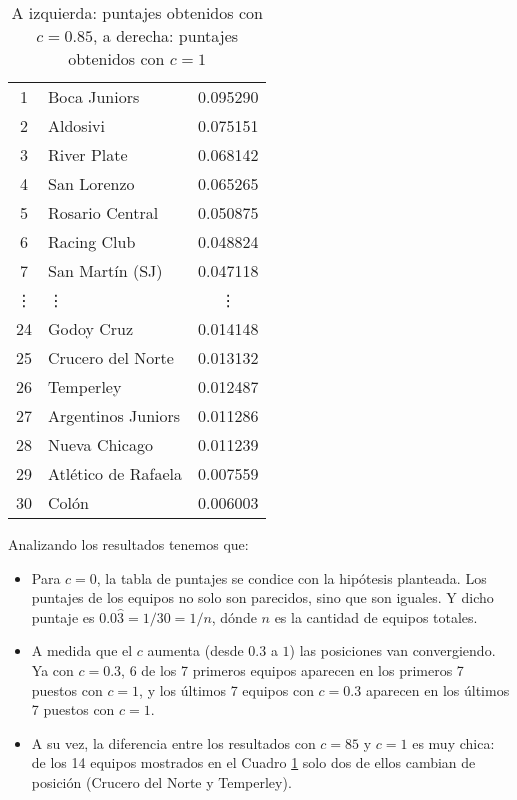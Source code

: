 \begin{table}[H]
\begin{center}
\begin{tabular}{| c | l | c |}
            1 & Boca Juniors & 0.095290 \\
            2 & Aldosivi & 0.075151 \\
            3 & River Plate & 0.068142 \\
            4 & San Lorenzo & 0.065265 \\
            5 & Rosario Central & 0.050875 \\
            6 & Racing Club & 0.048824 \\
            7 & San Martín (SJ) & 0.047118 \\
            \vdots & \quad\vdots & \vdots \\
            24 & Godoy Cruz & 0.014148 \\
            25 & Crucero del Norte & 0.013132 \\
            26 & Temperley & 0.012487 \\
            27 & Argentinos Juniors & 0.011286 \\
            28 & Nueva Chicago & 0.011239 \\
            29 & Atlético de Rafaela & 0.007559 \\
            30 & Colón & 0.006003 \\
            \hline
        \end{tabular}
        \captionsetup{justification=centering}
        \caption{A izquierda: puntajes obtenidos con $c=0.85$, a derecha: puntajes obtenidos con $c=1$}
        \label{exp_resultados_variar_c_2}
    \end{center}
\end{table}

Analizando los resultados tenemos que:

\begin{itemize}
    \item Para $c=0$, la tabla de puntajes se condice con la hipótesis planteada.
        Los puntajes de los equipos no solo son parecidos, sino que son iguales.
        Y dicho puntaje es $0.0\hat{3} = 1/30 = 1/n$, dónde $n$ es la cantidad de
        equipos totales.
    \item A medida que el $c$ aumenta (desde $0.3$ a $1$) las posiciones van convergiendo.
        Ya con $c=0.3$, 6 de los 7 primeros equipos aparecen en los primeros 7 puestos con $c=1$,
        y los últimos 7 equipos con $c=0.3$ aparecen en los últimos 7 puestos con $c=1$.
    \item A su vez, la diferencia entre los resultados con $c=85$ y $c=1$ es muy chica:
        de los 14 equipos mostrados en el Cuadro \ref{exp_resultados_variar_c_2} solo dos
        de ellos cambian de posición (Crucero del Norte y Temperley).
\end{itemize}

